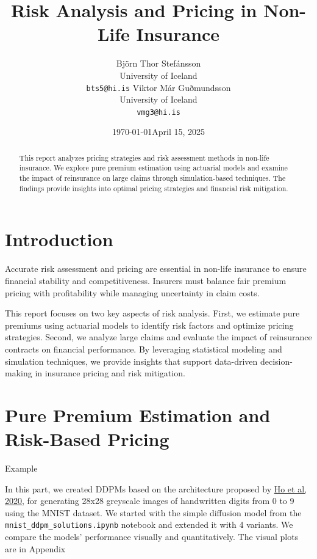 \documentclass[8pt]{article}
\title{Risk Analysis and Pricing in Non-Life Insurance}
\date{\today}
\author{%
  Björn Thor Stefánsson \\
  University of Iceland \\
  \texttt{bts5@hi.is}
  \And
  Viktor Már Guðmundsson \\
  University of Iceland \\
  \texttt{vmg3@hi.is} 
}
\date{April 15, 2025}
\begin{document}
\maketitle

\begin{abstract}
  This report analyzes pricing strategies and risk assessment methods in non-life insurance. We explore pure premium estimation using actuarial models and examine the impact of reinsurance on large claims through simulation-based techniques. The findings provide insights into optimal pricing strategies and financial risk mitigation.
\end{abstract}


\section{Introduction}
\label{sec:intro}
Accurate risk assessment and pricing are essential in non-life insurance to ensure financial stability and competitiveness. Insurers must balance fair premium pricing with profitability while managing uncertainty in claim costs. 

This report focuses on two key aspects of risk analysis. First, we estimate pure premiums using actuarial models to identify risk factors and optimize pricing strategies. Second, we analyze large claims and evaluate the impact of reinsurance contracts on financial performance. By leveraging statistical modeling and simulation techniques, we provide insights that support data-driven decision-making in insurance pricing and risk mitigation.

\section{Pure Premium Estimation and Risk-Based Pricing}
\label{sec:partA}

Example

In this part, we created DDPMs based on the architecture proposed by \href{https://arxiv.org/abs/2006.11239}{Ho et al, 2020,} for generating 28x28 greyscale images of handwritten digits from 0 to 9 using the MNIST dataset. We started with the simple diffusion model from the {\color{blue}\small{\texttt{mnist\_ddpm\_solutions.ipynb}}} notebook and extended it with 4 variants. We compare the models' performance visually and quantitatively. The visual plots are in Appendix
\end{document}
